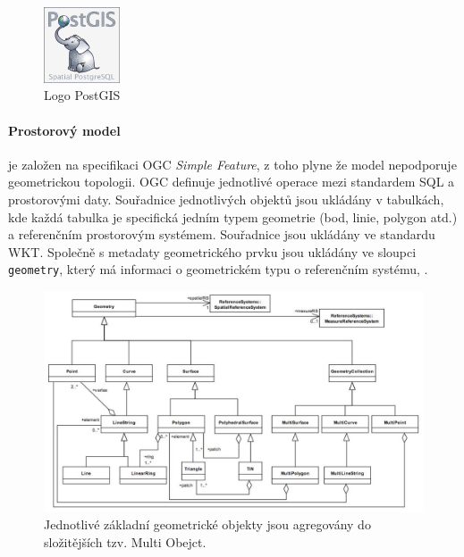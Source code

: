 \documentclass[a4paper,12pt,oneside]{report}
\begin{document}
  
\begin{figure}[h!]
    \centering
    \includegraphics[width=0.2\textwidth]{./img/implementace/postgis.png}
    \caption[Logo PostGIS]{\centering  Logo PostGIS \footnotemark}
 \end{figure}   

\paragraph*{Prostorový model} 
je založen na specifikaci    \acs{OGC} \textit{Simple Feature}, z toho
plyne že model nepodporuje geometrickou topologii. OGC definuje
jednotlivé operace mezi standardem SQL a prostorovými daty. Souřadnice
jednotlivých objektů jsou ukládány v tabulkách, kde každá tabulka je
specifická jedním typem geometrie (bod, linie, polygon atd.) a
referenčním prostorovým systémem. Souřadnice jsou ukládány ve
standardu    \acs{WKT}. Společně s metadaty  geometrického prvku jsou
ukládány ve sloupci \texttt{geometry}, který má informaci o
geometrickém typu o referenčním systému, \cite{postgis}.

\begin{figure}[h!]
    \centering
    \includegraphics[width=1\textwidth]{./img/implementace/ogc1.jpg}
    \caption[Model PostGIS]{\centering Jednotlivé základní geometrické objekty 
    jsou agregovány do složitějších tzv. Multi Obejct.     \footnotemark}
 \end{figure}   
\end{document}
